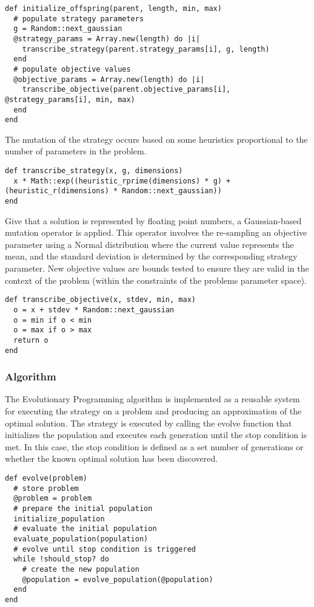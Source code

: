 \begin{lstlisting}
def initialize_offspring(parent, length, min, max)
  # populate strategy parameters
  g = Random::next_gaussian
  @strategy_params = Array.new(length) do |i|
    transcribe_strategy(parent.strategy_params[i], g, length)
  end
  # populate objective values
  @objective_params = Array.new(length) do |i|
    transcribe_objective(parent.objective_params[i], @strategy_params[i], min, max)
  end
end
\end{lstlisting}

The mutation of the strategy occurs based on some heuristics proportional to the number of parameters in the problem.

\begin{lstlisting}
def transcribe_strategy(x, g, dimensions)
  x * Math::exp((heuristic_rprime(dimensions) * g) + (heuristic_r(dimensions) * Random::next_gaussian))
end
\end{lstlisting}

Give that a solution is represented by floating point numbers, a Gaussian-based mutation operator is applied. This operator involves the re-sampling an objective parameter using a Normal distribution where the current value represents the mean, and the standard deviation is determined by the corresponding strategy parameter. New objective values are bounds tested to ensure they are valid in the context of the problem (within the constraints of the problems parameter space).

\begin{lstlisting}
def transcribe_objective(x, stdev, min, max)
  o = x + stdev * Random::next_gaussian
  o = min if o < min
  o = max if o > max
  return o
end
\end{lstlisting}

\subsubsection{Algorithm}
The Evolutionary Programming algorithm is implemented as a reusable system for executing the strategy on a problem and producing an approximation of the optimal solution. The strategy is executed by calling the evolve function that initializes the population and executes each generation until the stop condition is met. In this case, the stop condition is defined as a set number of generations or whether the known optimal solution has been discovered.

\begin{lstlisting}
def evolve(problem)
  # store problem
  @problem = problem
  # prepare the initial population
  initialize_population
  # evaluate the initial population
  evaluate_population(population)
  # evolve until stop condition is triggered
  while !should_stop? do
    # create the new population
    @population = evolve_population(@population)
  end
end
\end{lstlisting}

